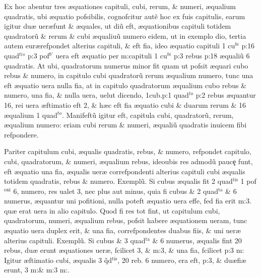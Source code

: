 Ex hoc abentur tres {\ae}quationes capituli, cubi, rerum, \& numeri, {\ae}qualium quadratis, ubi {\ae}quatio pofsibilis, cognofcitur aut\~{e} hoc ex fuis capitulis, earum igitur du{\ae} uer\ae funt \& {\ae}quales, ut di{\ct}\~{u} eft, {\ae}quationibus capituli totidem quadrator\~{u} \& rerum \& cubi {\ae}qualiu\~{u} numero eidem, ut in exemplo di{\ct}o, tertia autem eur\ae refpondet alterius capituli, \& eft fi{\ct}a, ideo {\ae}quatio capituli 1 cu\(^{bi}\) p:16 quad\(^{tis}\) p:3 pof\(^{b'}\) uera eft {\ae}quatio per m:capituli 1 cu\(^{bi}\) p:3 rebus p:18 {\ae}quali\~{u} 6 quadratis. At ubi, quadratorum numerus minor fit quam ut pofsit {\ae}quari cubo rebus \& numero, in capitulo cubi quadrator\~{u} rerum {\ae}qualium numero, tunc una eft {\ae}quatio uera nulla fi{\ct}a, at in capitulo quadratorum {\ae}qualium cubo rebus \& numero, una fi{\ct}a, \& nulla uera, uelut dicendo, 1cub.p:1 quad\(^{to}\) p:2 rebus {\ae}quantur 16, rei uera {\ae}ftimatio eft 2, \& h{\ae}c eft fi{\ct}a {\ae}quatio cubi \& duarum rerum \& 16 {\ae}qualium 1 quad\(^{to}\). Manifeft\~{u} igitur eft, capitula cubi, quadrator\~{u}, rerum, {\ae}qualium numero: eriam cubi rerum \& numeri, {\ae}quali\~{u} quadratis inuicem fibi refpondere.

 Pariter capitulum cubi, {\ae}qualis quadratis, rebus, \& numero, refpondet capitulo, cubi, quadratorum, \& numeri, {\ae}qualium rebus, ideo\que ubis res admod\~{u} pauc\c{e} funt, eft {\ae}quatio una fi{\ct}a, {\ae}qualis uer{\ae} correfpondenti alterius capituli cubi {\ae}qualis totidem quadratis, rebus \& numero. Exempl\~{u}. Si cubus {\ae}qualis fit 2 quad\( ^{\text{tis}} \) 1 pof\( ^{\text{oni}} \) 6, numero, res ualet 3, nec plus aut minus, quia fi cubus \& 2 quad\( ^{\text{ta}} \) \& 6 numerus, {\ae}quantur uni pofitioni, nulla poteft {\ae}quatio uera effe, fed fi{\ct}a erit m:3. qu{\ae} erat uera in alio capitulo. Quod fi res tot fint, ut capitulum cubi, quadratorum, numeri, {\ae}qualium rebus, pofsit habere {\ae}quationem ueram, tunc {\ae}quatio uera duplex erit, \& una fi{\ct}a, correfpondentes duabus fi{\ct}is, \& uni uer{\ae} alterius capituli. Exempl\~{u}. Si cubus \& 3 quad\( ^{\text{ta}} \) \& 6 numerus, {\ae}qualis fint 20 rebus, du{\ae} erunt {\ae}quationes uer{\ae}, fcilicet 3, \&  m:3, \& una fi{\ct}a, fcilicet  p:3 m: Igitur {\ae}ftimatio cubi, {\ae}qualis 3 \~{q}d\( ^{\text{tis}} \), 20 reb. 6 numero, era eft,  p:3, \& du\ae fi{\ct\ae} erunt, 3 m:\&  m:3 m:.

